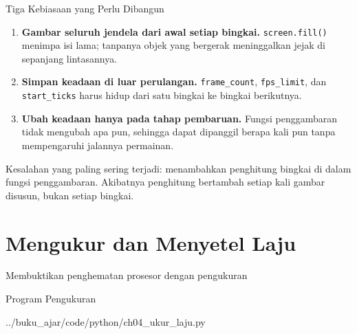 \documentclass[aspectratio=169,10pt]{beamer}
\begin{document}
\begin{frame}{Tiga Kebiasaan yang Perlu Dibangun}
\begin{enumerate}
  \item \textbf{Gambar seluruh jendela dari awal setiap bingkai.}
        \texttt{screen.fill()} menimpa isi lama; tanpanya objek yang bergerak
        meninggalkan jejak di sepanjang lintasannya.
  \item \textbf{Simpan keadaan di luar perulangan.} \texttt{frame\_count},
        \texttt{fps\_limit}, dan \texttt{start\_ticks} harus hidup dari satu
        bingkai ke bingkai berikutnya.
  \item \textbf{Ubah keadaan hanya pada tahap pembaruan.} Fungsi penggambaran
        tidak mengubah apa pun, sehingga dapat dipanggil berapa kali pun tanpa
        mempengaruhi jalannya permainan.
\end{enumerate}
\begin{peringatan}
Kesalahan yang paling sering terjadi: menambahkan penghitung bingkai di dalam
fungsi penggambaran. Akibatnya penghitung bertambah setiap kali gambar
disusun, bukan setiap bingkai.
\end{peringatan}
\end{frame}

\section{Mengukur dan Menyetel Laju}
  {Membuktikan penghematan prosesor dengan pengukuran}

\begin{frame}[fragile]{Program Pengukuran}

  {../buku_ajar/code/python/ch04_ukur_laju.py}
\end{frame}
\end{document}
